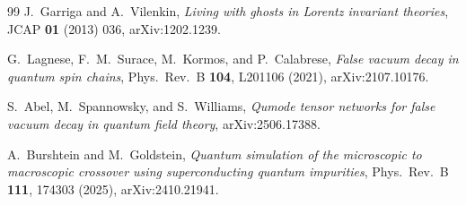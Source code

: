 \documentclass[11pt]{article}
\begin{document}
\begin{thebibliography}{99}
J.~Garriga and A.~Vilenkin,
\emph{Living with ghosts in Lorentz invariant theories},
JCAP \textbf{01} (2013) 036, arXiv:1202.1239.

G.~Lagnese, F.~M.~Surace, M.~Kormos, and P.~Calabrese,
\emph{False vacuum decay in quantum spin chains},
Phys.\ Rev.\ B \textbf{104}, L201106 (2021), arXiv:2107.10176.

S.~Abel, M.~Spannowsky, and S.~Williams,
\emph{Qumode tensor networks for false vacuum decay in quantum
field theory},
arXiv:2506.17388.

A.~Burshtein and M.~Goldstein,
\emph{Quantum simulation of the microscopic to macroscopic crossover
using superconducting quantum impurities},
Phys.\ Rev.\ B \textbf{111}, 174303 (2025), arXiv:2410.21941.

\end{thebibliography}
\end{document}
